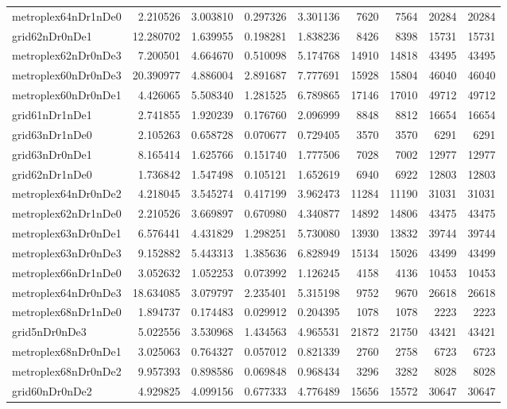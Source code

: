 \begin{longtable}{|l|r|r|r|r|r|r|r|r|}
metroplex64nDr1nDe0 & 2.210526 & 3.003810 & 0.297326 & 3.301136 & 7620 & 7564 & 20284 & 20284 \\
grid62nDr0nDe1 & 12.280702 & 1.639955 & 0.198281 & 1.838236 & 8426 & 8398 & 15731 & 15731 \\
metroplex62nDr0nDe3 & 7.200501 & 4.664670 & 0.510098 & 5.174768 & 14910 & 14818 & 43495 & 43495 \\
metroplex60nDr0nDe3 & 20.390977 & 4.886004 & 2.891687 & 7.777691 & 15928 & 15804 & 46040 & 46040 \\
metroplex60nDr0nDe1 & 4.426065 & 5.508340 & 1.281525 & 6.789865 & 17146 & 17010 & 49712 & 49712 \\
grid61nDr1nDe1 & 2.741855 & 1.920239 & 0.176760 & 2.096999 & 8848 & 8812 & 16654 & 16654 \\
grid63nDr1nDe0 & 2.105263 & 0.658728 & 0.070677 & 0.729405 & 3570 & 3570 & 6291 & 6291 \\
grid63nDr0nDe1 & 8.165414 & 1.625766 & 0.151740 & 1.777506 & 7028 & 7002 & 12977 & 12977 \\
grid62nDr1nDe0 & 1.736842 & 1.547498 & 0.105121 & 1.652619 & 6940 & 6922 & 12803 & 12803 \\
metroplex64nDr0nDe2 & 4.218045 & 3.545274 & 0.417199 & 3.962473 & 11284 & 11190 & 31031 & 31031 \\
metroplex62nDr1nDe0 & 2.210526 & 3.669897 & 0.670980 & 4.340877 & 14892 & 14806 & 43475 & 43475 \\
metroplex63nDr0nDe1 & 6.576441 & 4.431829 & 1.298251 & 5.730080 & 13930 & 13832 & 39744 & 39744 \\
metroplex63nDr0nDe3 & 9.152882 & 5.443313 & 1.385636 & 6.828949 & 15134 & 15026 & 43499 & 43499 \\
metroplex66nDr1nDe0 & 3.052632 & 1.052253 & 0.073992 & 1.126245 & 4158 & 4136 & 10453 & 10453 \\
metroplex64nDr0nDe3 & 18.634085 & 3.079797 & 2.235401 & 5.315198 & 9752 & 9670 & 26618 & 26618 \\
metroplex68nDr1nDe0 & 1.894737 & 0.174483 & 0.029912 & 0.204395 & 1078 & 1078 & 2223 & 2223 \\
grid5nDr0nDe3 & 5.022556 & 3.530968 & 1.434563 & 4.965531 & 21872 & 21750 & 43421 & 43421 \\
metroplex68nDr0nDe1 & 3.025063 & 0.764327 & 0.057012 & 0.821339 & 2760 & 2758 & 6723 & 6723 \\
metroplex68nDr0nDe2 & 9.957393 & 0.898586 & 0.069848 & 0.968434 & 3296 & 3282 & 8028 & 8028 \\
grid60nDr0nDe2 & 4.929825 & 4.099156 & 0.677333 & 4.776489 & 15656 & 15572 & 30647 & 30647 \\

\end{longtable}

